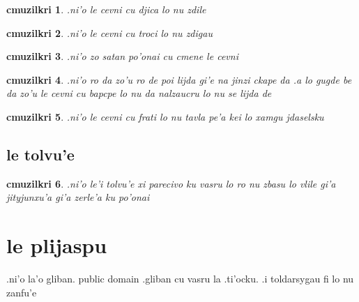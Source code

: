 \documentclass{report}
\newtheorem{cmuzilkri}{cmuzilkri}
\begin{document}
\begin{cmuzilkri}
        .ni'o le cevni cu djica lo nu zdile
\end{cmuzilkri}
\begin{cmuzilkri}
        .ni'o le cevni cu troci lo nu zdigau
\end{cmuzilkri}
\begin{cmuzilkri}
        .ni'o zo satan po'onai cu cmene le cevni
\end{cmuzilkri}
\begin{cmuzilkri}
        .ni'o ro da zo'u ro de poi lijda gi'e na jinzi ckape da .a lo gugde be da zo'u le cevni cu bapcpe lo nu da nalzaucru lo nu se lijda de
\end{cmuzilkri}
\begin{cmuzilkri}
        .ni'o le cevni cu frati lo nu tavla pe'a kei lo xamgu jdaselsku
\end{cmuzilkri}

\section{le tolvu'e}
\begin{cmuzilkri}
        .ni'o le'i tolvu'e xi parecivo ku vasru lo ro nu zbasu lo vlile gi'a jityjunxu'a gi'a zerle'a ku po'onai
\end{cmuzilkri}

\chapter{le plijaspu}
.ni'o la'o gliban. public domain .gliban cu vasru la .ti'ocku.  .i toldarsygau fi lo nu zanfu'e
\end{document}
